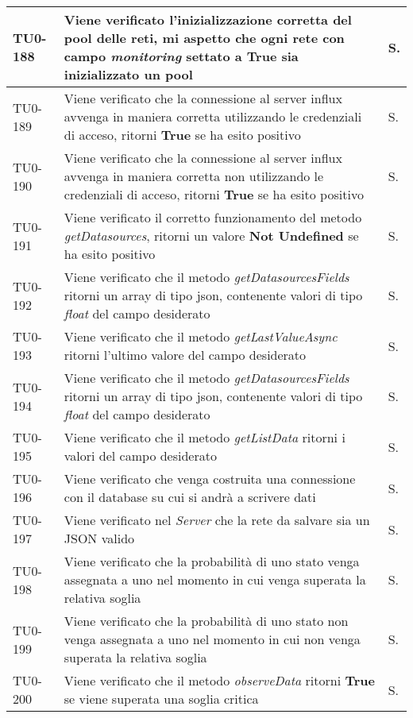 \begin{longtable}{|C{.15\textwidth}|m{.66\textwidth}|C{.10\textwidth}|}
\hline
TU0-188 & Viene verificato l'inizializzazione corretta del pool delle reti, mi aspetto che ogni rete con campo \textit{monitoring} settato a \textbf{True} sia inizializzato un pool & S.\\
\hline
{}TU0-189 & Viene verificato che la connessione al server influx avvenga in maniera corretta utilizzando le credenziali di acceso, ritorni \textbf{True} se ha esito positivo & S.\\
\hline
TU0-190 & Viene verificato che la connessione al server influx avvenga in maniera corretta non utilizzando le credenziali di acceso, ritorni \textbf{True} se ha esito positivo & S.\\
\hline
{}TU0-191 & Viene verificato il corretto funzionamento del metodo \textit{getDatasources}, ritorni un valore \textbf{Not Undefined} se ha esito positivo & S.\\
\hline
TU0-192 & Viene verificato che il metodo \textit{getDatasourcesFields} ritorni un array di tipo json, contenente valori di tipo \textit{float} del campo desiderato & S.\\
\hline
{}TU0-193 & Viene verificato che il metodo \textit{getLastValueAsync} ritorni l'ultimo valore del campo desiderato & S.\\
\hline
TU0-194 & Viene verificato che il metodo \textit{getDatasourcesFields} ritorni un array di tipo json, contenente valori di tipo \textit{float} del campo desiderato & S.\\
\hline
{}TU0-195 & Viene verificato che il metodo \textit{getListData} ritorni i valori del campo desiderato & S.\\
\hline
TU0-196 & Viene verificato che venga costruita una connessione con il database su cui si andrà a scrivere dati & S.\\
\hline
{}TU0-197 & Viene verificato nel \textit{Server} che la rete da salvare sia un JSON valido & S.\\
\hline
TU0-198 & Viene verificato che la probabilità di uno stato venga assegnata a uno nel momento in cui venga superata la relativa soglia & S.\\
\hline
{}TU0-199 & Viene verificato che la probabilità di uno stato non venga assegnata a uno nel momento in cui non venga superata la relativa soglia & S.\\
\hline
TU0-200 & Viene verificato che il metodo \textit{observeData} ritorni \textbf{True} se viene superata una soglia critica & S.\\

\end{longtable}
